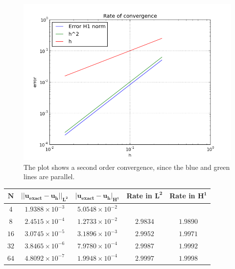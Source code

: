\documentclass[11pt,a4paper,titlepage]{report}
\begin{document}
\vspace{1cm}
\begin{figure}[h!]
\centering
\includegraphics[width=\textwidth]{images/convergence_sine}
\caption{The plot shows a second order convergence, since the blue and green lines are parallel.}
\end{figure}
\vspace{1cm}

\begin{center}
\begin{tabular}{| c | c | c | c | c |}
\hline
$  \mathbf{N}$ & $ \mathbf{|| u_{exact} - u_h ||_{L^2}}$ & $  \mathbf{ | u_{exact} - u_h |_{H^1}}$ & \textbf{Rate in }  $ \mathbf{L^2}$ & \textbf{Rate in } $  \mathbf{H^1}$  \\
\hline
$ 4 $ & $1.9388 \times 10^{-3}$ & $5.0548 \times 10^{-2}$  & & \\
\hline
$ 8$ & $2.4515  \times 10^{-4}$ & $1.2733 \times 10^{-2}$ &  $2.9834$ &  $1.9890$   \\
\hline
$ 16 $ & $ 3.0745 \times 10^{-5}$ & $3.1896 \times 10^{-3}$ & $ 2.9952 $ & $1.9971$   \\
\hline
$ 32$ & $3.8465 \times 10^{-6}$ & $7.9780 \times 10^{-4}$ & $ 2.9987 $ & $ 1.9992 $  \\
\hline
$ 64$ & $4.8092 \times 10^{-7}$ & $1.9948 \times 10^{-4}$  & $ 2.9997 $ & $1.9998$ \\
\hline
\end{tabular}
\end{center}
\end{document}
